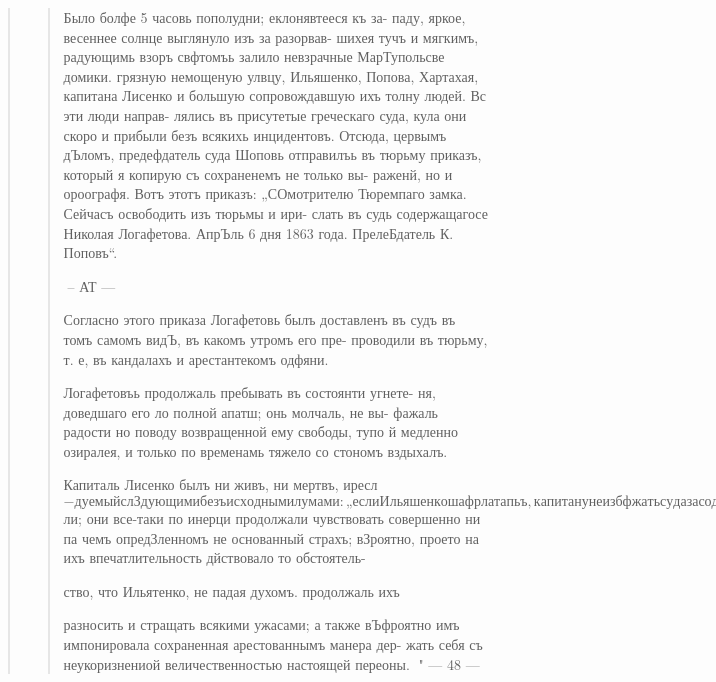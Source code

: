 \begin{quote}
\begin{quote}
Было болфе 5 часовь пополудни; еклонявтееся къ за-
паду, яркое, весеннее солнце выглянуло изъ за разорвав-
шихея тучъ и мягкимъ, радующимь взоръ свфтомъь залило
невзрачные МарТупольсве домики. грязную немощеную улвцу,
Ильяшенко, Попова, Хартахая, капитана Лисенко и большую
сопровождавшую ихъ толну людей. Вс эти люди направ-
лялись въ присутетые греческаго суда, кула они скоро
и прибыли безъ всякихь инцидентовъ. Отсюда, цервымъ
дЪломъ, предефдатель суда Шоповь отправилъь въ тюрьму
приказъ, который я копирую съ сохраненемъ не только вы-
раженй, но и ороографя. Вотъ этотъ приказъ: „СОмотрителю
Тюремпаго замка. Сейчасъ освободить изъ тюрьмы и ири-
слать въ судь содержащагосе Николая Логафетова. АпрЪль
6 дня 1863 года. ПрелеБдатель К. Поповъ“.

-- АТ —

Согласно этого приказа Логафетовь былъ доставленъ
въ судъ въ томъ самомъ видЪ, въ какомъ утромъ его пре-
проводили въ тюрьму, т. е, въ кандалахъ и арестантекомъ
одфяни.

Логафетовъь продолжаль пребывать въ состоянти угнете-
ня, доведшаго его ло полной апатш; онь молчаль, не вы-
фажаль радости но поводу возвращенной ему свободы, тупо
й медленно озиралея, и только по временамь тяжело со
стономъ вздыхалъ.

Капиталь Лисенко былъ ни живъ, ни мертвъ, иресл$-
дуемый слЗдующими безъисходными лумами: „если Ильяшенко
шафрлатапьъ, капитану не избфжать суда за содфаянное надъ
„Лотафетовымъ; если же Ильятенко таинственный и чрезвы-
чайный начальникъ, какъ въ этомъ онъ продолжаль упорно
увфрать, постоянно твердя: „попомните меня, никото не
забуду“... то совефмъ не трудно угодить въ каторгу, еели
не на зисфлицу“... .

Хартахай, предефхалель, засвдалель и ваводнивиие при-
сутстые суда именитые граждане пылали зл0б0й противъ
Ильяшенко, обиженные посмфян1емъ надъ ихъ роднымъ учреж-
дентемъ и наль вовми ими.

Снявъ съ Лотафетова арестантекое одзян1е, эти разсер-
женные люди со злобой одЪли въ него лжеуполномоченнаго.

Но заключить Ильяшенко въ кандалы греки не поем$ли;
они все-таки по инерци продолжали чувствовать совершенно
ни па чемъ опредЗленномъ не основанный страхъ; вЗроятно,
проето на ихъ впечатлительность дйствовало то обстоятель-

ство, что Ильятенко, не падая духомъ. продолжаль ихъ

разносить и стращать всякими ужасами; а также вЪфроятно
имъ импонировала сохраненная арестованнымъ манера дер-
жать себя съ неукоризнениой величественностью настоящей
переоны.
" — 48 —


\end{quote}
\end{quote}
